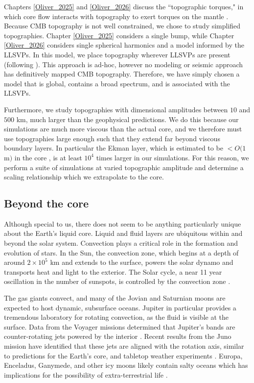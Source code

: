 Chapters \ref{Oliver_2025} and \ref{Oliver_2026} discuss the ``topographic torques," in which core flow interacts with topography to exert torques on the mantle \citep{rH69,pR12}. 
Because CMB topography is not well constrained, we chose to study simplified topographies. Chapter \ref{Oliver_2025} considers a single bump, while Chapter \ref{Oliver_2026} considers single spherical harmonics and a model informed by the LLSVPs. 
In this model, we place topography wherever LLSVPs are present (following \citep{vL12}). 
This approach is ad-hoc, however no modeling or seismic approach has definitively mapped CMB topography. 
Therefore, we have simply chosen a model that is global, contains a broad spectrum, and is associated with the LLSVPs.

Furthermore, we study topographies with dimensional amplitudes between $10$ and $500$ km, much larger than the geophysical predictions. 
We do this because our simulations are much more viscous than the actual core, and we therefore must use topographies large enough such that they extend far beyond viscous boundary layers. 
In particular the Ekman layer, which is estimated to be $<O(1$m$)$ in the core \citep[e.g.][]{hG68}, is at least  $10^{4}$ times larger in our simulations. 
For this reason, we perform a suite of simulations at varied topographic amplitude and determine a scaling relationship which we extrapolate to the core.

\subsection{Beyond the core}
Although special to us, there does not seem to be anything particularly unique about the Earth's liquid core. 
Liquid and fluid layers are ubiquitous within and beyond the solar system.
Convection plays a critical role in the formation and evolution of stars. In the Sun, the convection zone, which begins at a depth of around $2\times10^{5}$ km and extends to the surface, powers the solar dynamo and transports heat and light to the exterior.
The Solar cycle, a near 11 year oscillation in the number of sunspots, is controlled by the convection zone \citep[e.g.][]{eP55,mO03}.
 
The gas giants convect, and many of the Jovian and Saturnian moons are expected to host dynamic, subsurface oceans. 
Jupiter in particular provides a tremendous laboratory for rotating convection, as the fluid is visible at the surface.
Data from the Voyager missions determined that Jupiter's bands are counter-rotating jets powered by the interior \citep[e.g.][]{pG86,sL86}. 
Recent results from the Juno mission have identified that these jets are aligned with the rotation axis, similar to predictions for the Earth's core, and tabletop weather experiments \citep{eG21}.
Europa, Enceladus, Ganymede, and other icy moons likely contain salty oceans which has implications for the possibility of extra-terrestrial life \citep{fN16}.

